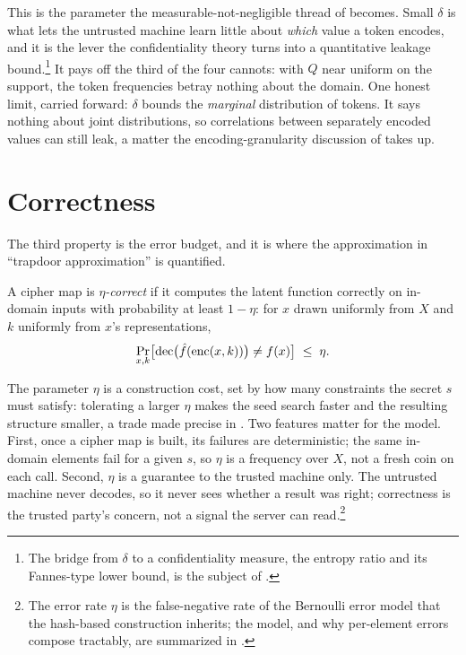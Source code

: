 This is the parameter the measurable-not-negligible thread of
 becomes. Small $\delta$ is what lets the
untrusted machine learn little about \emph{which} value a token encodes, and
it is the lever the confidentiality theory turns into a quantitative leakage
bound.\footnote{The bridge from $\delta$ to a confidentiality measure, the
entropy ratio and its Fannes-type lower bound, is the subject of
.} It pays off the third of the four cannots: with
$Q$ near uniform on the support, the token frequencies betray nothing about
the domain. One honest limit, carried forward: $\delta$ bounds the
\emph{marginal} distribution of tokens. It says nothing about joint
distributions, so correlations between separately encoded values can still
leak, a matter the encoding-granularity discussion of 
takes up.

\section{Correctness}
\label{sec:correctness}

The third property is the error budget, and it is where the approximation in
``trapdoor approximation'' is quantified.

\begin{definition}
\label{def:correctness}
A cipher map is \emph{$\eta$-correct} if it computes the latent function
correctly on in-domain inputs with probability at least $1 - \eta$: for
$x$ drawn uniformly from $X$ and $k$ uniformly from $x$'s representations,
\[
  \Pr_{x, k}\bigl[\operatorname{dec}\bigl(\hat{f}(\operatorname{enc}(x, k))\bigr) \neq f(x)\bigr]
  \;\leq\; \eta .
\]
\end{definition}

The parameter $\eta$ is a construction cost, set by how many constraints the
secret $s$ must satisfy: tolerating a larger $\eta$ makes the seed search
faster and the resulting structure smaller, a trade made precise in
. Two features matter for the model. First, once a
cipher map is built, its failures are deterministic; the same in-domain
elements fail for a given $s$, so $\eta$ is a frequency over $X$, not a
fresh coin on each call. Second, $\eta$ is a guarantee to the trusted
machine only. The untrusted machine never decodes, so it never sees whether
a result was right; correctness is the trusted party's concern, not a signal
the server can read.\footnote{The error rate $\eta$ is the false-negative
rate of the Bernoulli error model that the hash-based construction inherits;
the model, and why per-element errors compose tractably, are summarized in
.}

